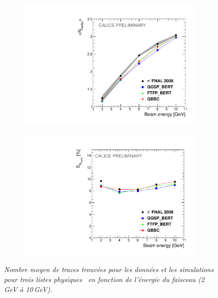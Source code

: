 \begin{figure}
	\centering
	\begin{subfigure}{0.5\textwidth}
		\centering
		\includegraphics[width=.90\linewidth]{ECAL/plots/ntracks-graph.pdf}
		\caption{\label{fig:tracksgraphF} }
	\end{subfigure}%
	\begin{subfigure}{0.5\textwidth}
		\centering
		\includegraphics[width=.90\linewidth]{ECAL/plots/ntracks-graph-delta.pdf}
		\caption{\label{fig:dtracksgraphF}}
	\end{subfigure}
	\caption{\label{fig:fulltrackgraphF} \sl Nombre moyen de traces trouvées pour les données et les simulations  pour trois listes physiques \geant\ en fonction de l'énergie du faisceau (2\,GeV à 10\,GeV). }
\end{figure}


\newpage
